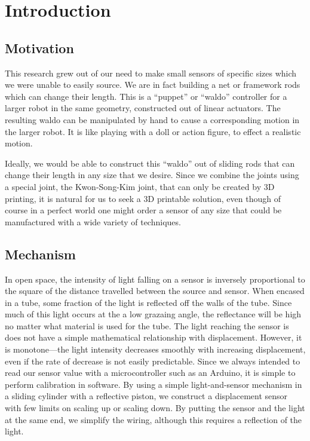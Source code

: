 \documentclass[10pt,conference,compsocconf]{IEEEtran}
\begin{document}
\section{Introduction}

\subsection{Motivation}

This research grew out of our need to make small sensors of specific
sizes which we were unable to easily source.  We are in fact building
a net or framework rods which can change their length. This is a
“puppet” or “waldo” controller for a larger robot in the same
geometry, constructed out of linear actuators. The resulting waldo can
be manipulated by hand to cause a corresponding motion in the larger
robot. It is like playing with a doll or action figure, to effect a
realistic motion.

Ideally, we would be able to construct this “waldo” out of sliding
rods that can change their length in any size that we desire. Since we
combine the joints using a special joint, the Kwon-Song-Kim joint,
that can only be created by 3D printing, it is natural for us to seek
a 3D printable solution, even though of course in a perfect world one
might order a sensor of any size that could be manufactured with a
wide variety of techniques.


\subsection{Mechanism}

In open space, the intensity of light falling on a sensor is inversely
proportional to the square of the distance travelled between the
source and sensor. 
When encased in a tube, some fraction of the light
is reflected off the walls of the tube. Since much of this light occurs at the a low
grazaing angle, the reflectance will be high no matter what material is used for the tube.
The light reaching the
sensor is does not have a simple mathematical relationship with
displacement.  However, it is monotone---the light intensity decreases
smoothly with increasing displacement, even if the rate of decrease is
not easily predictable. Since we always intended to read our sensor
value with a microcontroller such as an Arduino, it is simple to
perform calibration in software. By using a simple light-and-sensor
mechanism in a sliding cylinder with a reflective piston, we construct
a displacement sensor with few limits on scaling up or scaling
down. By putting the sensor and the light at the same end, we simplify
the wiring, although this requires a reflection of the light.
\end{document}
